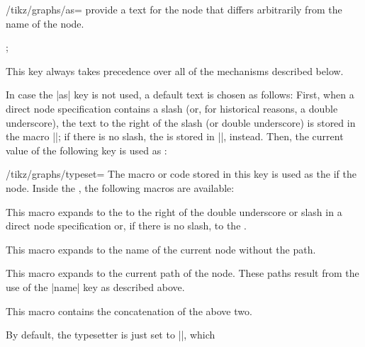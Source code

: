 \begin{itemize}
\begin{key}{/tikz/graphs/as=}
            provide a text for the node that differs arbitrarily from the name
            of the node.
\begin{codeexample}[preamble={\usetikzlibrary{graphs}}]
\tikz {};
\end{codeexample}
            This key always takes precedence over all of the mechanisms
            described below.
        \end{key}
        In case the |as| key is not used, a default text is chosen as follows:
        First, when a direct node specification contains a slash (or, for
        historical reasons, a double underscore), the text to the right of the
        slash (or double underscore) is stored in the macro
        |\tikzgraphnodetext|; if there is no slash, the  is
        stored in |\tikzgraphnodetext|, instead. Then, the current value of the
        following key is used as :
        \begin{key}{/tikz/graphs/typeset=}
            The macro or code stored in this key is used as the  if
            the node. Inside the , the following macros are
            available:
            \begin{command}{\tikzgraphnodetext}
                This macro expands to the  to the right of the
                double underscore or slash in a direct node specification or,
                if there is no slash, to the .
            \end{command}
            \begin{command}{\tikzgraphnodename}
                This macro expands to the name of the current node without the
                path.
            \end{command}
            \begin{command}{\tikzgraphnodepath}
                This macro expands to the current path of the node. These paths
                result from the use of the |name| key as described above.
            \end{command}
            \begin{command}{\tikzgraphnodefullname}
                This macro contains the concatenation of the above two.
            \end{command}
        \end{key}
        By default, the typesetter is just set to |\tikzgraphnodetext|, which

\end{itemize}
